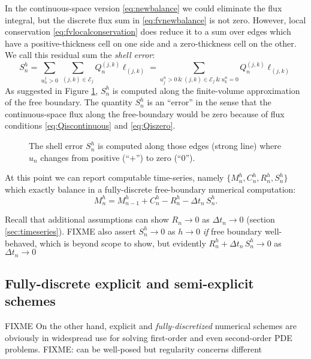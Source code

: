 \documentclass[final,onefignum]{siamart190516}
\begin{document}
In the continuous-space version \eqref{eq:newbalance} we could eliminate the flux integral, but the discrete flux sum in \eqref{eq:fvnewbalance} is not zero.  However, local conservation \eqref{eq:fvlocalconservation} does reduce it to a sum over edges which have a positive-thickness cell on one side and a zero-thickness cell on the other.  We call this residual sum the \emph{shell error}:
\begin{equation}
S_n^h = \sum_{u_n^j>0}\, \sum_{(j,k)\in\mathcal{E}_j} Q_n^{(j,k)} \ell_{(j,k)} = \sum_{u_j^n > 0 \,\&\, (j,k)\in\mathcal{E}_j \,\&\, u_k^n = 0} Q_n^{(j,k)} \ell_{(j,k)} \label{eq:fvderiveshellerror}
\end{equation}
As suggested in Figure \ref{fig:fvmesh-shellerror}, $S_n^h$ is computed along the finite-volume approximation of the free boundary.  The quantity $S_n^h$ is an ``error'' in the sense that the continuous-space flux along the free-boundary would be zero because of flux conditions \eqref{eq:Qiscontinuous} and \eqref{eq:Qiszero}.

\begin{figure}[ht]
\begin{center}

\end{center}
\caption{The shell error $S_n^h$ is computed along those edges (strong line) where $u_n$ changes from positive (``$+$'') to zero (``$0$'').}
\label{fig:fvmesh-shellerror}
\end{figure}

At this point we can report computable time-series, namely $\{M_n^h,C_n^h,R_n^h,S_n^h\}$ which exactly balance in a fully-discrete free-boundary numerical computation:
\begin{equation}
  M_n^h = M_{n-1}^h + C_n^h - R_n^h - \Delta t_n\,S_n^h. \label{eq:fvfinalbalance}
\end{equation}

Recall that additional assumptions can show $R_n\to 0$ as $\Delta t_n\to 0$ (section \ref{sec:timeseries}).  FIXME also assert $S_n^h\to 0$ as $h\to 0$ \emph{if} free boundary well-behaved, which is beyond scope to show, but evidently $R_n^h + \Delta t_n\,S_n^h \to 0$ as $\Delta t_n\to 0$

\subsection{Fully-discrete explicit and semi-explicit schemes} \label{subsec:spaceexplicit}
FIXME  On the other hand, explicit and \emph{fully-discretized} numerical schemes are obviously in widespread use for solving first-order and even second-order PDE problems.  FIXME:  can be well-posed but regularity concerns different
\end{document}
